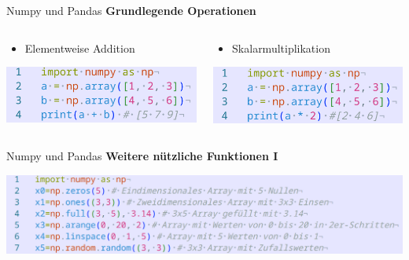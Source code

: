 \documentclass[aspectratio=169]{beamer}
\begin{document}
\begin{frame}{Numpy und Pandas}
    \textbf{Grundlegende Operationen}
    \begin{columns}
        \begin{column}{0.5\textwidth}
            \begin{itemize}
                \item Elementweise Addition
            \end{itemize}
            \begin{tcolorbox}[colframe=oxfordblue, colback=blue!10, coltitle=white, title=Python]
                \includegraphics[width=\textwidth]{images/code_numpyelementwiseoperation.png}
            \end{tcolorbox}
        \end{column}
        \pause
        \begin{column}{0.5\textwidth}
            \begin{itemize}
                \item Skalarmultiplikation
            \end{itemize}
            \begin{tcolorbox}[colframe=oxfordblue, colback=blue!10, coltitle=white, title=Python]
                \includegraphics[width=\textwidth]{images/code_numpyscalarproduct.png}
            \end{tcolorbox}
        \end{column}
    \end{columns}
\end{frame}

\begin{frame}{Numpy und Pandas}
    \textbf{Weitere nützliche Funktionen I}
    \begin{tcolorbox}[colframe=oxfordblue, colback=blue!10, coltitle=white, title=Python]
    \includegraphics[width=\textwidth]{images/code_numpyusefulfunctions.png}
\end{tcolorbox}
\end{frame}
\end{document}
